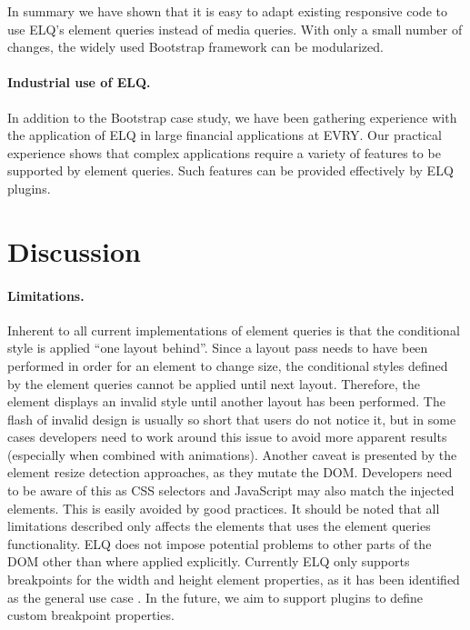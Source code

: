 \documentclass[]{llncs}
\newcommand{\elq}{ELQ}
\begin{document}
    In summary we have shown that it is easy to adapt existing responsive code to use \elq{}'s element queries instead of media queries.
    With only a small number of changes, the widely used Bootstrap framework can be modularized.

    \paragraph{Industrial use of \elq{}.}
    In addition to the Bootstrap case study, we have been gathering experience with the application of \elq{} in large financial applications at EVRY.
    Our practical experience shows that complex applications require a variety of features to be supported by element queries.
    Such features can be provided effectively by \elq{} plugins.

\section{Discussion}\label{sec:discussion}
  \paragraph{Limitations.}
    Inherent to all current implementations of element queries is that the conditional style is applied ``one layout behind''.
    Since a layout pass needs to have been performed in order for an element to change size, the conditional styles defined by the element queries cannot be applied until next layout.
    Therefore, the element displays an invalid style until another layout has been performed.
    The flash of invalid design is usually so short that users do not notice it, but in some cases developers need to work around this issue to avoid more apparent results (especially when combined with animations).
    Another caveat is presented by the element resize detection approaches, as they mutate the DOM.
    Developers need to be aware of this as CSS selectors and JavaScript may also match the injected elements.
    This is easily avoided by good practices.
    It should be noted that all limitations described only affects the elements that uses the element queries functionality.
    \elq{} does not impose potential problems to other parts of the DOM other than where applied explicitly.
    Currently \elq{} only supports breakpoints for the width and height element properties, as it has been identified as the general use case \cite{elq-thesis}.
    In the future, we aim to support plugins to define custom breakpoint properties.
\end{document}
